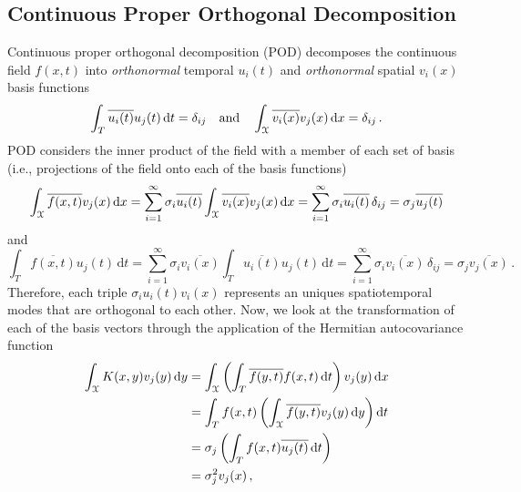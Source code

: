 \documentclass[10pt]{article}
\newcommand{\norm}[1]{\left\Vert#1\right\Vert}
\begin{document}
\subsection{Continuous Proper Orthogonal Decomposition}

Continuous proper orthogonal decomposition (POD) decomposes the continuous field
$f(x,t)$ into {\em orthonormal} temporal $u_i(t)$ and {\em orthonormal} spatial $v_i(x)$ basis functions
\begin{equation}
    \int_T \overline{ u_i(t) } u_j(t) \, \mathrm{d} t = \delta_{ij} \quad \mathrm{and} \quad 
    \int_{\cal X} \overline{ v_i(x) } v_j(x) \, \mathrm{d} x = \delta_{ij}\,. 
\end{equation}
POD considers the inner product of the field with a member of each set of basis (i.e., projections of the field onto each of the basis functions)
\begin{equation}
    \int_{\cal X} \overline{f(x,t)} v_j(x) \, \mathrm{d} x= \sum_{i=1}^\infty \sigma_{i} \overline{u_i(t)} 
    \int_{\cal X} \overline{v_i(x)} v_j(x) \, \mathrm{d} x = \sum_{i=1}^\infty \sigma_{i} \overline{u_i(t)} \,\delta_{ij} = \sigma_{j} \overline{u_j(t)}
\end{equation}
and
\begin{equation}
    \int_T \overline{f(x,t)} u_j(t) \, \mathrm{d} t = \sum_{i=1}^\infty \sigma_{i} \overline{v_i(x)} 
    \int_T \overline{u_i(t)} u_j(t) \, \mathrm{d} t = \sum_{i=1}^\infty \sigma_{i} \overline{v_i(x)} \, \delta_{ij} = \sigma_{j} \overline{v_j(x)}\,.
\end{equation}
Therefore, each triple $\sigma_{i}u_i(t)v_i(x)$ represents an uniques spatiotemporal modes that are orthogonal to each other.
Now, we look at the transformation of each of the basis vectors through the application of the Hermitian autocovariance function
\begin{equation}
\begin{aligned}
    \int_{\cal X}  K(x,y) {v_j(y)}\, \mathrm{d} y & = 
    \int_{\cal X} 
    \left(
    \int_T \overline{f(y,t)} f(x,t)\, \mathrm{d}t 
    \right) 
    {v_j(y)}\, \mathrm{d} x\\
    & = 
    \int_T f(x,t)
    \left( 
    \int_{\cal X} \overline{f(y,t)} v_j(y) \, \mathrm{d} y
    \right) 
    \mathrm{d} t\\
    & = \sigma_{j} \left(
    \int_T {f(x,t)}
     \overline{u_j(t)}\, \mathrm{d} t\right)\\
    & =\sigma_{j}^2 v_j(x)\,,
\end{aligned}
\end{equation}
\end{document}
